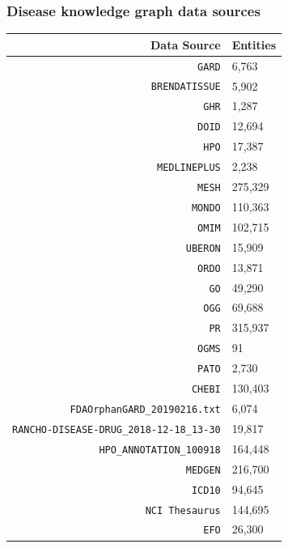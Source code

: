 ﻿\documentclass[anchorcolor=blue,linkcolor=blue]{beamer}
\begin{document}
\begin{frame}
  \frametitle{Disease knowledge graph data sources}
  \begin{center}
    \tiny
    \begin{tabular}{rl}\toprule
      Data Source & Entities\\ \midrule
      \texttt{GARD}&6,763\\
      \texttt{BRENDATISSUE}&5,902\\
      \texttt{GHR}&1,287\\
      \texttt{DOID}&12,694\\
      \texttt{HPO}&17,387\\
      \texttt{MEDLINEPLUS}&2,238\\
      \texttt{MESH}&275,329\\
      \texttt{MONDO}&110,363\\
      \texttt{OMIM}&102,715\\
      \texttt{UBERON}&15,909\\
      \texttt{ORDO}&13,871\\
      \texttt{GO}&49,290\\
      \texttt{OGG}&69,688\\
      \texttt{PR}&315,937\\
      \texttt{OGMS}&91\\
      \texttt{PATO}&2,730\\
      \texttt{CHEBI}&130,403\\
      \texttt{FDAOrphanGARD\_20190216.txt}&6,074\\
      \texttt{RANCHO-DISEASE-DRUG\_2018-12-18\_13-30}&19,817\\
      \texttt{HPO\_ANNOTATION\_100918}&164,448\\
      \texttt{MEDGEN} &216,700\\
      \texttt{ICD10} &94,645 \\
      \texttt{NCI Thesaurus} & 144,695\\
      \texttt{EFO} & 26,300\\ \bottomrule
    \end{tabular}
  \end{center}
\end{frame}
\end{document}
